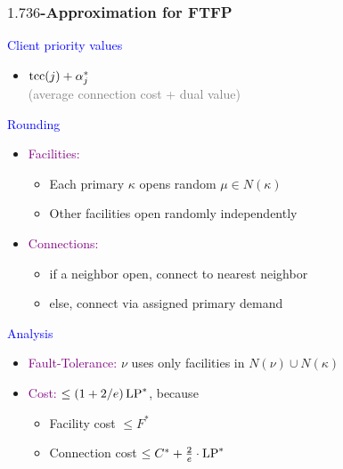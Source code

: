 \documentclass[hyperref,dvipsnames,svgnames,compress]{beamer}
\begin{document}
\begin{frame}
  \frametitle{$1.736$-Approximation for FTFP} 

{\large

\textcolor{blue}{Client priority values}	
	
	\begin{itemize}
		\item $\mbox{\rm{tcc}}(j) + \alpha_j^\ast$ 
			\\
				{\normalsize \textcolor{gray}{(average connection cost + dual value)}}
	\end{itemize}

\textcolor{blue}{Rounding}

  	\begin{itemize}
  	  	\item  \textcolor{purple}{Facilities:} 
			\begin{itemize}
				\item Each primary $\kappa$ opens random $\mu\in N(\kappa)$
				\item Other facilities open randomly independently
			\end{itemize}
	  	\item \textcolor{purple}{Connections:} 
	 		\begin{itemize}
					\item if a neighbor open, connect to nearest neighbor
					\item else, connect via assigned primary demand
			\end{itemize}
  	\end{itemize}

\textcolor{blue}{Analysis}

  \begin{itemize}
  	\item \textcolor{purple}{Fault-Tolerance:} $\nu$ uses only facilities in
    			$N(\nu) \cup N(\kappa)$
  	\item \textcolor{purple}{Cost:} $\le (1+2/e)\,\mbox{\rm LP}^\ast$, because
    	\begin{itemize}
    		\item Facility cost $\le F^\ast$
    		\item Connection cost $\le C^\ast + \frac{2}{e}\cdot \mbox{\rm LP}^\ast$
    	\end{itemize}
  \end{itemize}
}
\end{frame}

\end{document}
